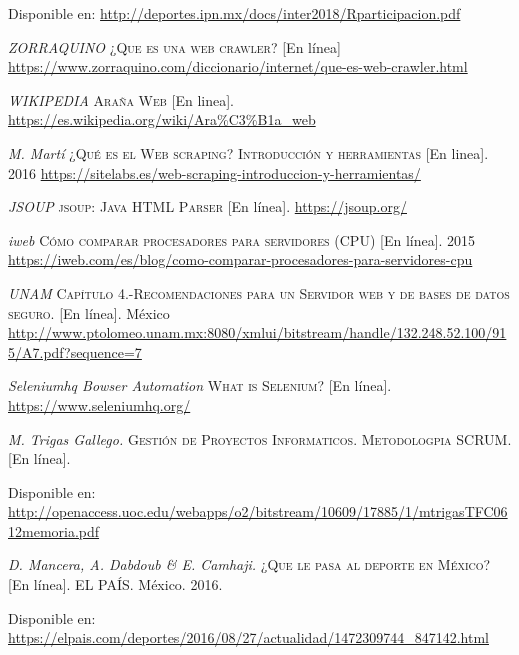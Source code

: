 \begin{thebibliography}{}
	Disponible en: 
	\url{http://deportes.ipn.mx/docs/inter2018/Rparticipacion.pdf}
	
	\textit{ZORRAQUINO}
	\textsc{¿Que es una web crawler?}
	[En línea]
	\url{https://www.zorraquino.com/diccionario/internet/que-es-web-crawler.html}
	
	\textit{WIKIPEDIA}
	\textsc{Araña Web}
	[En linea].
	\newline
	\url{https://es.wikipedia.org/wiki/Ara\%C3\%B1a_web}
	
	\textit{M. Martí}
	\textsc{¿Qué es el Web scraping? Introducción y herramientas}
	[En linea]. 2016
	\url{https://sitelabs.es/web-scraping-introduccion-y-herramientas/}
	
	\textit{JSOUP}
	\textsc{jsoup: Java HTML Parser}
	[En línea].
	\newline
	\url{https://jsoup.org/}
	
	\textit{iweb}
	\textsc{Cómo comparar procesadores para servidores (CPU)}
	[En línea]. 2015
	\newline
	\url{https://iweb.com/es/blog/como-comparar-procesadores-para-servidores-cpu}
	
	\textit{UNAM}
	\textsc{Capítulo 4.-Recomendaciones para un Servidor web y de bases de datos seguro.}
	[En línea]. México
	\newline
	\url{http://www.ptolomeo.unam.mx:8080/xmlui/bitstream/handle/132.248.52.100/915/A7.pdf?sequence=7}
	
	
	
	\textit{Seleniumhq Bowser Automation}
	\textsc{What is Selenium?}
	[En línea].
	\newline
	\url{https://www.seleniumhq.org/}
	
	
	\textit{M. Trigas Gallego.}
	\textsc{Gestión de Proyectos Informaticos. Metodologpia SCRUM.} [En línea].
	
	Disponible en: 
	\url{http://openaccess.uoc.edu/webapps/o2/bitstream/10609/17885/1/mtrigasTFC0612memoria.pdf}	
	
	\textit{D. Mancera, A. Dabdoub \& E. Camhaji.}
	\textsc{¿Que le pasa al deporte en México?} [En línea].
	EL PAÍS. México. 2016.
	
	Disponible en: 
	\url{https://elpais.com/deportes/2016/08/27/actualidad/1472309744_847142.html}	
	

\end{thebibliography}
